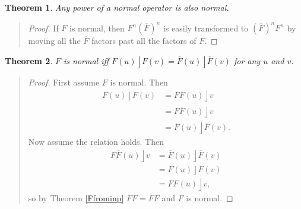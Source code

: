\documentclass{utarticle}
\DeclareMathOperator{\lin}{\rfloor}
\newcommand{\adj}[1]{\ensuremath{\overline{#1}}}
\newtheorem{thm}{Theorem}
\newcommand{\bp}{\begin{quotation} \begin{proof}}
\newcommand{\ep}{\end{proof} \end{quotation}}
\begin{document}
\begin{thm} Any power of a normal operator is also normal. \end{thm}
\bp
If $F$ is normal, then $F^n (\adj{F})^n$ is easily transformed to $(\adj{F})^n F^n$ by moving 
all the \adj{F} factors past all the factors of $F$.
\ep

\begin{thm}
$F$ is normal iff $F(u) \lin F(v) = \adj{F}(u) \lin \adj{F}(v)$ for any $u$ and $v$.
\end{thm}
\bp
First assume $F$ is normal.  Then
\begin{align}
F(u) \lin F(v) & = \adj{F}F(u) \lin v \nonumber \\
                       & = F\adj{F}(u) \lin v \nonumber \\
                       & = \adj{F}(u) \lin \adj{F}(v).
\end{align}
Now assume the relation holds.  Then
\begin{align}
F \adj{F}(u) \lin v & = \adj{F}(u) \lin \adj{F}(v) \nonumber \\
                              & = F(u) \lin F(v) \nonumber \\
                              & = \adj{F}F(u) \lin v,
\end{align}
so by Theorem \ref{Ffrominp} $F\adj{F} = \adj{F}F$ and $F$ is normal.
\ep
\end{document}
